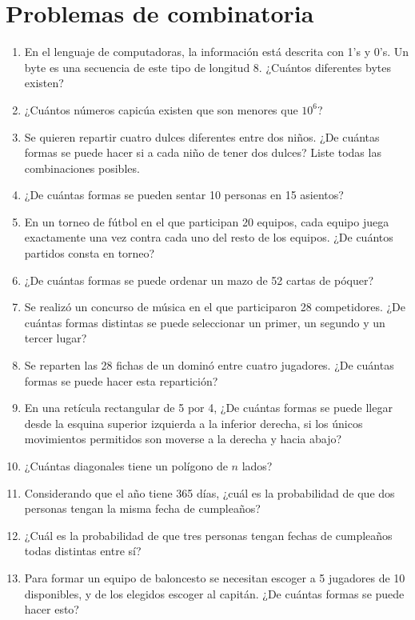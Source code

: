 \documentclass{report}
\begin{document}
	
\section*{Problemas de combinatoria}
\begin{enumerate}
\item En el lenguaje de computadoras, la información está descrita con 1's y 0's. Un byte es una secuencia de este tipo de longitud 8.
¿Cuántos diferentes bytes existen?

\item ¿Cuántos números capicúa existen que son menores que $10^6$?

\item Se quieren repartir cuatro dulces diferentes entre dos niños. ¿De cuántas formas se puede hacer si a cada niño de tener dos dulces? Liste todas las combinaciones posibles.

\item ¿De cuántas formas se pueden sentar 10 personas en 15 asientos?

\item En un torneo de fútbol en el que participan 20 equipos, cada equipo juega exactamente una vez contra cada uno del resto de los equipos. ¿De cuántos partidos consta en torneo?

\item ¿De cuántas formas se puede ordenar un mazo de 52 cartas de póquer?

\item Se realizó un concurso de música en el que participaron 28 competidores. ¿De cuántas formas distintas se puede seleccionar un primer, un segundo y un tercer lugar?

\item Se reparten las 28 fichas de un dominó entre cuatro jugadores. ¿De cuántas formas se puede hacer esta repartición?

\item En una retícula rectangular de 5 por 4, ¿De cuántas formas se puede llegar desde la esquina superior izquierda a la inferior derecha, si los únicos movimientos permitidos son moverse a la derecha y hacia abajo?

\item ¿Cuántas diagonales tiene un polígono de $n$ lados?

\item Considerando que el año tiene 365 días, ¿cuál es la probabilidad de que dos personas tengan la misma fecha de cumpleaños?

\item ¿Cuál es la probabilidad de que tres personas tengan fechas de cumpleaños todas distintas entre sí?

\item Para formar un equipo de baloncesto se necesitan escoger a 5 jugadores de 10 disponibles, y de los elegidos escoger al capitán. ¿De cuántas formas se puede hacer esto?

\end{enumerate}
\end{document}
